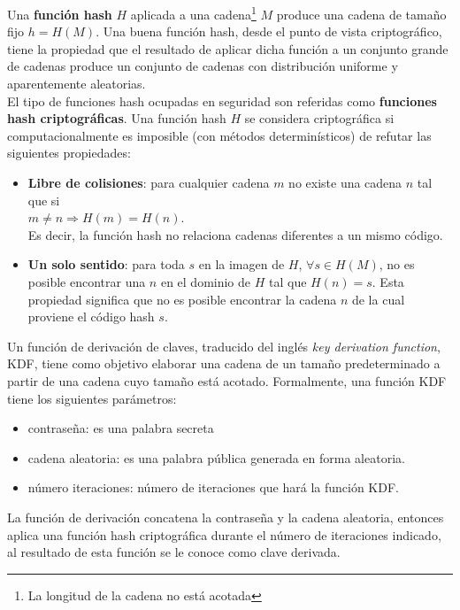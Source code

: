 Una \textbf{función hash} $H$ aplicada a una cadena\footnote{La longitud de la cadena no está acotada} $M$ produce una cadena de tamaño fijo $h=H(M)$. Una buena función hash, desde el punto de vista criptográfico, tiene la propiedad que el resultado de aplicar dicha función a un conjunto grande de cadenas produce un conjunto de cadenas con distribución uniforme y aparentemente aleatorias\cite{CryptographyNetworkSecurity}.\\
El tipo de funciones hash ocupadas en seguridad son referidas como \textbf{funciones hash criptográficas}. Una función hash $H$ se considera criptográfica si computacionalmente es imposible (con métodos determinísticos) de refutar las siguientes propiedades\cite{CryptographyNetworkSecurity}:
\begin{itemize}
	\item \textbf{Libre de colisiones}: para cualquier cadena $m$ no existe una cadena $n$ tal que si\\
	$m \neq n \Rightarrow H(m) = H(n)$.\\
	Es decir, la función hash no relaciona cadenas diferentes a un mismo código.
	\item \textbf{Un solo sentido}: para toda $s$ en la imagen de $H$, $\forall s \in H(M)$, no es posible encontrar una $n$ en el dominio de $H$ tal que $H(n) = s$. Esta propiedad significa que no es posible encontrar la cadena $n$ de la cual proviene el código hash $s$.
\end{itemize}
Un función de derivación de claves, traducido del inglés \textit{key derivation function}, KDF, tiene como objetivo elaborar una cadena de un tamaño predeterminado a partir de una cadena cuyo tamaño está acotado. Formalmente, una función KDF tiene los siguientes parámetros\cite{UnderstandingCryptography, CryptographyTheoryPractice}:
\begin{itemize}
	\item contraseña: es una palabra secreta
	\item cadena aleatoria: es una palabra pública generada en forma aleatoria.
	\item número iteraciones: número de iteraciones que hará la función KDF.
\end{itemize}
La función de derivación concatena la contraseña y la cadena aleatoria, entonces aplica una función hash criptográfica durante el número de iteraciones indicado, al resultado de esta función se le conoce como clave derivada\cite{UnderstandingCryptography, CryptographyTheoryPractice}.

